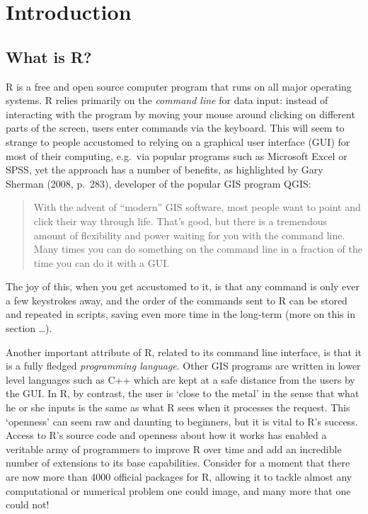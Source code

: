 \documentclass[]{article}
\author{}
\date{}
\begin{document}
\section{Introduction}

\subsection{What is R?}

R is a free and open source computer program that runs on all major
operating systems. R relies primarily on the \emph{command line} for
data input: instead of interacting with the program by moving your mouse
around clicking on different parts of the screen, users enter commands
via the keyboard. This will seem to strange to people accustomed to
relying on a graphical user interface (GUI) for most of their computing,
e.g.~via popular programs such as Microsoft Excel or SPSS, yet the
approach has a number of benefits, as highlighted by Gary Sherman (2008,
p.~283), developer of the popular GIS program QGIS:

\begin{quote}
With the advent of ``modern'' GIS software, most people want to point
and click their way through life. That's good, but there is a tremendous
amount of flexibility and power waiting for you with the command line.
Many times you can do something on the command line in a fraction of the
time you can do it with a GUI.
\end{quote}

The joy of this, when you get accustomed to it, is that any command is
only ever a few keystrokes away, and the order of the commands sent to R
can be stored and repeated in scripts, saving even more time in the
long-term (more on this in section \ldots{}).

Another important attribute of R, related to its command line interface,
is that it is a fully fledged \emph{programming language}. Other GIS
programs are written in lower level languages such as C++ which are kept
at a safe distance from the users by the GUI. In R, by contrast, the
user is `close to the metal' in the sense that what he or she inputs is
the same as what R sees when it processes the request. This `openness'
can seem raw and daunting to beginners, but it is vital to R's success.
Access to R's source code and openness about how it works has enabled a
veritable army of programmers to improve R over time and add an
incredible number of extensions to its base capabilities. Consider for a
moment that there are now more than 4000 official packages for R,
allowing it to tackle almost any computational or numerical problem one
could image, and many more that one could not!
\end{document}
